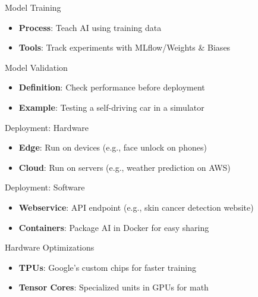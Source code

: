 \documentclass{beamer}
\begin{document}
\begin{frame}{Model Training}
\begin{itemize}
\item \textbf{Process}: Teach AI using training data
\item \textbf{Tools}: Track experiments with MLflow/Weights \& Biases
\end{itemize}
\end{frame}

\begin{frame}{Model Validation}
\begin{itemize}
\item \textbf{Definition}: Check performance before deployment
\item \textbf{Example}: Testing a self-driving car in a simulator
\end{itemize}
\end{frame}

\begin{frame}{Deployment: Hardware}
\begin{itemize}
\item \textbf{Edge}: Run on devices (e.g., face unlock on phones)
\item \textbf{Cloud}: Run on servers (e.g., weather prediction on AWS)
\end{itemize}
\end{frame}

\begin{frame}{Deployment: Software}
\begin{itemize}
\item \textbf{Webservice}: API endpoint (e.g., skin cancer detection website)
\item \textbf{Containers}: Package AI in Docker for easy sharing
\end{itemize}
\end{frame}

\begin{frame}{Hardware Optimizations}
\begin{itemize}
\item \textbf{TPUs}: Google’s custom chips for faster training
\item \textbf{Tensor Cores}: Specialized units in GPUs for math
\end{itemize}
\end{frame}
\end{document}
